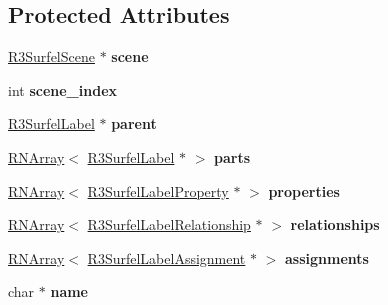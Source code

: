 \subsection*{Protected Attributes}
\begin{DoxyCompactItemize}
\item 
\hyperlink{class_r3_surfel_scene}{R3\+Surfel\+Scene} $\ast$ {\bfseries scene}\hypertarget{class_r3_surfel_label_aba71a198a7111ba51045392fc6c2b2c6}{}\label{class_r3_surfel_label_aba71a198a7111ba51045392fc6c2b2c6}

\item 
int {\bfseries scene\+\_\+index}\hypertarget{class_r3_surfel_label_ab7996d8ac718c3ff24d8953ae6ab161a}{}\label{class_r3_surfel_label_ab7996d8ac718c3ff24d8953ae6ab161a}

\item 
\hyperlink{class_r3_surfel_label}{R3\+Surfel\+Label} $\ast$ {\bfseries parent}\hypertarget{class_r3_surfel_label_a0b88351cd1e669b6b083d081cdfeb4df}{}\label{class_r3_surfel_label_a0b88351cd1e669b6b083d081cdfeb4df}

\item 
\hyperlink{class_r_n_array}{R\+N\+Array}$<$ \hyperlink{class_r3_surfel_label}{R3\+Surfel\+Label} $\ast$ $>$ {\bfseries parts}\hypertarget{class_r3_surfel_label_ad1789b91b0893bb7b812d3bf88647ae7}{}\label{class_r3_surfel_label_ad1789b91b0893bb7b812d3bf88647ae7}

\item 
\hyperlink{class_r_n_array}{R\+N\+Array}$<$ \hyperlink{class_r3_surfel_label_property}{R3\+Surfel\+Label\+Property} $\ast$ $>$ {\bfseries properties}\hypertarget{class_r3_surfel_label_a141ad437d5a29560d99499ef8916a9fb}{}\label{class_r3_surfel_label_a141ad437d5a29560d99499ef8916a9fb}

\item 
\hyperlink{class_r_n_array}{R\+N\+Array}$<$ \hyperlink{class_r3_surfel_label_relationship}{R3\+Surfel\+Label\+Relationship} $\ast$ $>$ {\bfseries relationships}\hypertarget{class_r3_surfel_label_acaddd66872c39453285ec5d4a98ba60c}{}\label{class_r3_surfel_label_acaddd66872c39453285ec5d4a98ba60c}

\item 
\hyperlink{class_r_n_array}{R\+N\+Array}$<$ \hyperlink{class_r3_surfel_label_assignment}{R3\+Surfel\+Label\+Assignment} $\ast$ $>$ {\bfseries assignments}\hypertarget{class_r3_surfel_label_ac2259cace360e553e4d6a97b58251db2}{}\label{class_r3_surfel_label_ac2259cace360e553e4d6a97b58251db2}

\item 
char $\ast$ {\bfseries name}\hypertarget{class_r3_surfel_label_a0b5cb42f53160a1dad6f9866ed7b83e4}{}\label{class_r3_surfel_label_a0b5cb42f53160a1dad6f9866ed7b83e4}


\end{DoxyCompactItemize}
